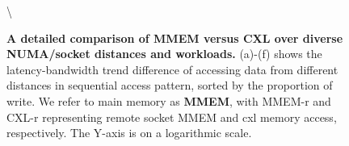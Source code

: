 \begin{figure}[t]
{  \label{fig:readwrite21}}%
  \backslash
  \newline
 \caption{\textbf{A detailed comparison of MMEM versus CXL over diverse NUMA/socket distances and workloads.} (a)-(f) shows the latency-bandwidth trend difference of accessing data from different distances in sequential access pattern, sorted by the proportion of write. We refer to main memory as \textbf{MMEM}, with MMEM-r and CXL-r representing remote socket MMEM and cxl memory access, respectively. The Y-axis is on a logarithmic scale.}
\label{fig:microbench-2}
\end{figure}

